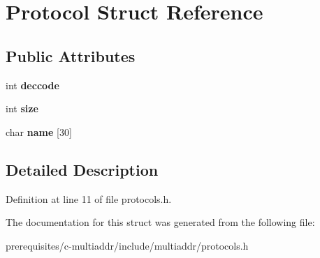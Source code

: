 \hypertarget{struct_protocol}{}\section{Protocol Struct Reference}
\label{struct_protocol}
\subsection*{Public Attributes}
\begin{DoxyCompactItemize}
\item 
\mbox{\label{struct_protocol_aa05afbf674a4c55effee61b231f6c6e0}} 
int {\bfseries deccode}
\item 
\mbox{\label{struct_protocol_a9b3ab5c38a42933eaaaaf5a041553e38}} 
int {\bfseries size}
\item 
\mbox{\label{struct_protocol_a22e2d2712cd6ee2edd72f3c51e07a6b5}} 
char {\bfseries name} \mbox{[}30\mbox{]}
\end{DoxyCompactItemize}


\subsection{Detailed Description}


Definition at line 11 of file protocols.\+h.



The documentation for this struct was generated from the following file\+:\begin{DoxyCompactItemize}
\item 
prerequisites/c-\/multiaddr/include/multiaddr/protocols.\+h\end{DoxyCompactItemize}
